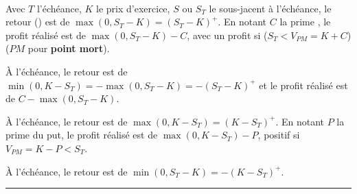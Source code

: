 \begin{f}

\ %


Avec \(T\) l'échéance, \(K\) le prix d'exercice, \(S\) ou \(S_T\) le sous-jacent à l'échéance, le retour () est de \(\max (0, S_T-K)=( S_T-K)^{+}\).
En notant \(C\) la prime , le profit réalisé est de \(\max (0, S_T-K)-C\), avec un profit si  (\(S_T<V_{PM}=K + C\))  (\(PM\) pour \textbf{point mort}).

		


\medskip



À l'échéance, le retour est de \(\min (0,K- S_T)=-\max(0, S_T-K)=-( S_T-K)^{+}\) et le profit réalisé est de \(C-\max (0, S_T-K)\).

\medskip

		
\medskip



À l'échéance, le retour est de \(\max (0,K- S_T)=(K- S_T)^{+}\).
En notant \(P\) la prime du put, le profit réalisé est de \(\max (0,K- S_T)-P\), positif si\(V_{PM}=K -P<S_T\).

\medskip

	    	     


\medskip

	    	     

À l'échéance, le retour est de \(\min (0, S_T-K)=-(K- S_T)^+\).


\end{f}
\hrule

